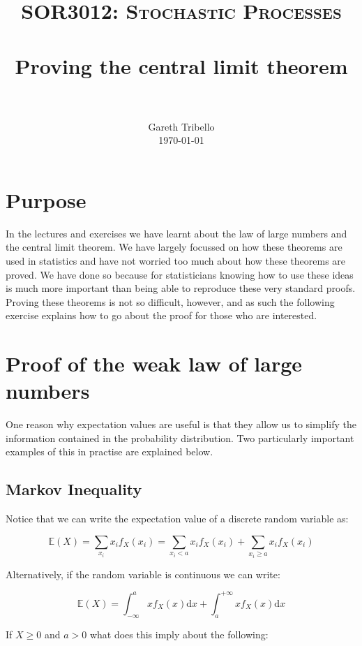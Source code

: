 \documentclass[paper=a4, fontsize=11pt]{scrartcl}
\title{\usefont{OT1}{bch}{b}{n} \normalfont \normalsize \textsc{SOR3012:
Stochastic Processes} \\ [25pt] \horrule{0.5pt} \\[0.4cm] 
\huge Proving the central limit theorem \\
\horrule{2pt} \\[0.5cm]
}
\author{ \normalfont
\normalsize
        Gareth Tribello \\[-3pt] \normalsize
        \today
}
\date{}
\numberwithin{equation}{section}
\numberwithin{figure}{section}
\numberwithin{table}{section}
\begin{document}
\maketitle

\section{Purpose}

In the lectures and exercises we have learnt about the law of large numbers and the central limit theorem.  We have largely focussed on how these theorems are used in statistics and have not worried 
too much about how these theorems are proved.  We have done so because for statisticians knowing how to use these ideas is much more important than being able to reproduce these very standard proofs. 
 Proving these theorems is not so difficult, however, and as such the following exercise explains how to go about the proof for those who are interested. 


\section{Proof of the weak law of large numbers}

One reason why expectation values are useful is that they allow us to
simplify the information contained in the probability distribution.  Two
particularly important examples of this in practise are explained below.

\subsection{Markov Inequality}

Notice that we can write the expectation value of a discrete random variable as:

\begin{equation}
 \mathbb{E}(X) = \sum_{x_i} x_i f_X(x_i) = \sum_{x_i<a} x_i f_X(x_i) + \sum_{x_i
\ge a} x_i f_X(x_i)
\end{equation}

\noindent Alternatively, if the random variable is continuous we can write:

\begin{equation}
 \mathbb{E}(X) = \int_{-\infty}^a x f_X(x) \textrm{d}x + \int_a^{+\infty} x
f_X(x) \textrm{d}x
\end{equation}

\noindent If $X \ge 0$ and $a > 0$ what does this imply about the following:
\end{document}
